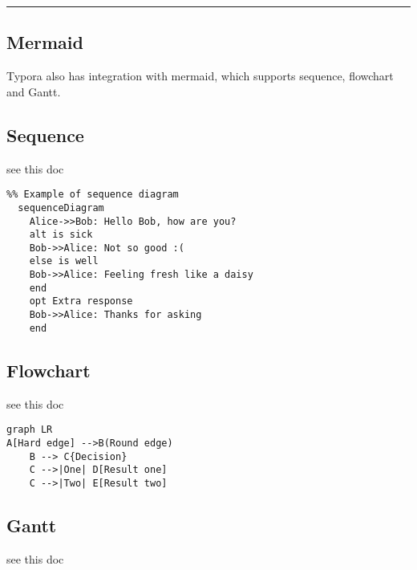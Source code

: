 \documentclass[]{article}
\begin{document}
\begin{center}\rule{0.5\linewidth}{\linethickness}\end{center}

\hypertarget{header-n23}{%
\subsection{Mermaid}\label{header-n23}}

Typora also has integration with mermaid, which supports sequence,
flowchart and Gantt.

\hypertarget{header-n26}{%
\subsection{Sequence}\label{header-n26}}

see this doc

\begin{verbatim}
%% Example of sequence diagram
  sequenceDiagram
    Alice->>Bob: Hello Bob, how are you?
    alt is sick
    Bob->>Alice: Not so good :(
    else is well
    Bob->>Alice: Feeling fresh like a daisy
    end
    opt Extra response
    Bob->>Alice: Thanks for asking
    end
\end{verbatim}

\hypertarget{header-n31}{%
\subsection{Flowchart}\label{header-n31}}

see this doc

\begin{verbatim}
graph LR
A[Hard edge] -->B(Round edge)
    B --> C{Decision}
    C -->|One| D[Result one]
    C -->|Two| E[Result two]
\end{verbatim}

\hypertarget{header-n37}{%
\subsection{Gantt}\label{header-n37}}

see this doc
\end{document}
